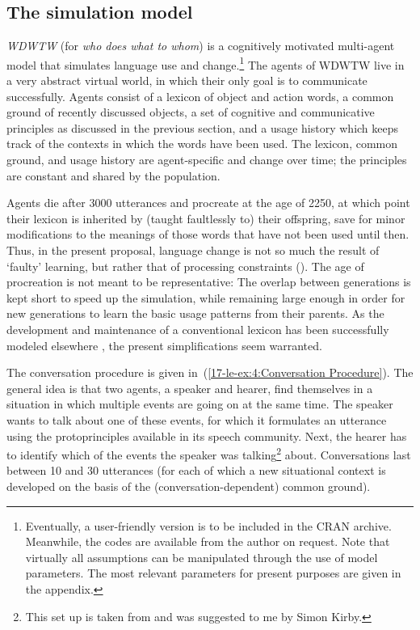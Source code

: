 \documentclass[output=paper]{LSP/langsci}
\begin{document}
\subsection{The simulation model}\label{17-le-sec:Simulation-Model}
\textit{WDWTW} (for \textit{who does what to whom}) is a cognitively motivated multi-agent model that simulates language use and change.\footnote{Eventually, a user-friendly version is to be included in the CRAN archive. Meanwhile, the codes are available from the author on request. Note that virtually all assumptions can be manipulated through the use of model parameters. The most relevant parameters for present purposes are given in the appendix.} The agents of WDWTW live in a very abstract virtual world, in which their only goal is to communicate successfully. Agents consist of a lexicon of object and action words, a common ground of recently discussed objects, a set of cognitive and communicative principles as discussed in the previous section, and a usage history which keeps track of the contexts in which the words have been used. The lexicon, common ground, and usage history are agent-specific and change over time; the principles are constant and shared by the population.

Agents die after 3000 utterances and procreate at the age of 2250, at which point their lexicon is inherited by (\ie taught faultlessly to) their offspring, save for minor modifications to the meanings of those words that have not been used until then. Thus, in the present proposal, language change is not so much the result of `faulty' learning, but rather that of processing constraints (\cf {}). The age of procreation is not meant to be representative: The overlap between generations is kept short to speed up the simulation, while remaining large enough in order for new generations to learn the basic usage patterns from their parents. As the development and maintenance of a conventional lexicon has been successfully modeled elsewhere \citep[e.g.][]{Hurford1989Biological, Hutchinsetal1995How, Steels1997Constructing, Kirby2000Syntax}, the present simplifications seem warranted. 

The conversation procedure is given in~(\ref{17-le-ex:4:Conversation Procedure}). The general idea is that two agents, a speaker and hearer, find themselves in a situation in which multiple events are going on at the same time. The speaker wants to talk about one of these events, for which it formulates an utterance using the protoprinciples available in its speech community. Next, the hearer has to identify which of the events the speaker was talking\footnote{This set up is taken from \cite{Steels2003Language} and was suggested to me by Simon Kirby.} about. Conversations last between 10 and 30 utterances (for each of which a new situational context is developed on the basis of the (conversation-dependent) common ground).
\end{document}
